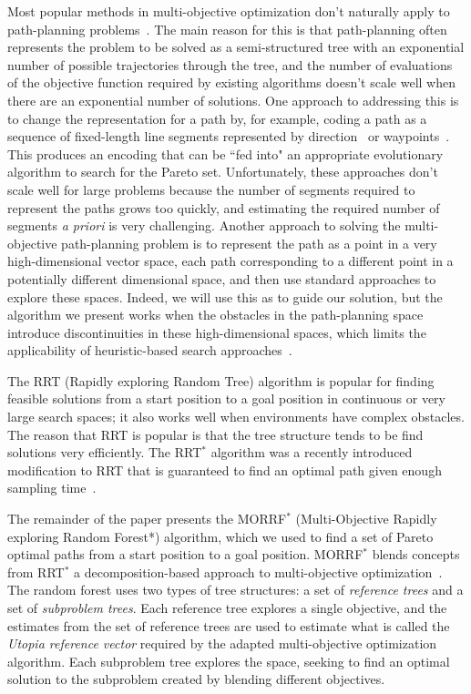 \documentclass{article}
\begin{document}
Most popular methods in multi-objective optimization don't naturally apply to path-planning problems~\cite{4358754,6600851}.
The main reason for this is that path-planning often represents the problem to be solved as a semi-structured tree with an exponential number of possible trajectories through the tree, and the number of evaluations of the objective function required by existing algorithms doesn't scale well when there are an exponential number of solutions. 
One approach to addressing this is to change the representation for a path by, for example, coding a path as a sequence of fixed-length line segments represented by direction~\cite{Ahmed2013,howlett2006learning} or waypoints~\cite{5160222,Pires2004}.  
This produces an encoding that can be ``fed into" an appropriate evolutionary algorithm to search for the Pareto set. 
Unfortunately, these approaches don't scale well for large problems because the number of segments required to represent the paths grows too quickly, and estimating the required number of segments {\em a priori} is very challenging.  
Another approach to solving the multi-objective path-planning problem is to represent the path as a point in a very high-dimensional vector space, each path corresponding to a different point in a potentially different dimensional space, and then use standard approaches to explore these spaces. 
Indeed, we will use this as to guide our solution, but the algorithm we present works when the obstacles in the path-planning space introduce discontinuities in these high-dimensional spaces, which limits the applicability of heuristic-based search approaches~\cite{5160222,4358754}.

The RRT (Rapidly exploring Random Tree) algorithm is popular for finding feasible solutions from a start position to a goal position in continuous or very large search spaces; it also works well when environments have complex obstacles. 
The reason that RRT is popular is that the tree structure tends to be find solutions very efficiently.
The RRT$^{*}$ algorithm was a recently introduced modification to RRT that is guaranteed to find an optimal path given enough sampling time~\cite{Karaman:2011:SAO:2000201.2000209,Karaman.Frazzoli:RSS10}.

The remainder of the paper presents the MORRF$^{*}$ (Multi-Objective Rapidly exploring Random Forest*) algorithm, which we used to find a set of Pareto optimal paths from a start position to a goal position.  
MORRF$^{*}$ blends concepts from RRT$^{*}$ a decomposition-based approach to multi-objective optimization~\cite{4358754}.  
The random forest uses two types of tree structures: a set of {\em reference trees} and a set of {\em subproblem trees}.  
Each reference tree explores a single objective, and the estimates from the set of reference trees are used to estimate what is called the {\em Utopia reference vector} required by the adapted multi-objective optimization algorithm.  
Each subproblem tree explores the space, seeking to find an optimal solution to the subproblem created by blending different objectives. 
\end{document}
